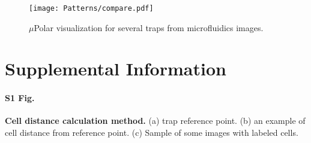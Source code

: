 \documentclass[conference]{IEEEtran}
\begin{document}
\begin{figure}
\centering
\texttt{[image: Patterns/compare.pdf]}
\caption{  $\mu$Polar visualization for several traps from microfluidics images.}
\label{fig:polar}
\end{figure}




 








\section{Supplemental Information}

\paragraph*{S1 Fig.}
\label{S1_Fig}
{\bf  Cell distance calculation method.} (a) trap reference point. (b) an example of cell distance from reference point. (c) Sample of some images with labeled cells. 
\end{document}
